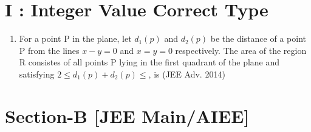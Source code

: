 \documentclass[12pt]{article}
\begin{document}
\section*{I    :     Integer Value Correct Type }
\begin{enumerate}
\item For a point P in the plane, let $d_1(p)$ and $d_2(p)$ be the distance of a point P
from the lines $x-y=0$ and $x=y=0$ respectively. The area of the region R consistes of all points P lying in the first quadrant of the plane and satisfying $2\leq d_1(p)+d_2(p)\leq$, is (JEE Adv. 2014)
\end{enumerate}

\section*{Section-B   [JEE Main/AIEE]}
\end{document}
